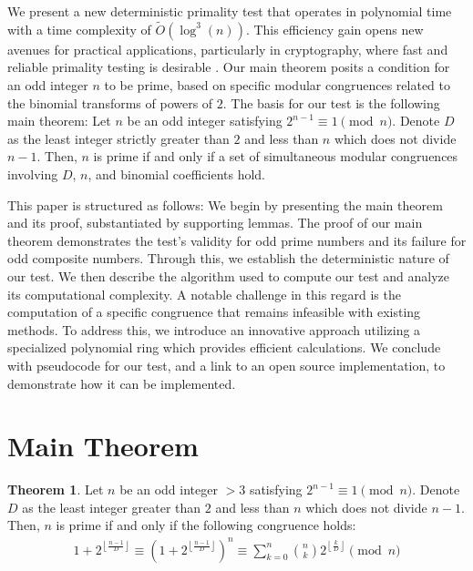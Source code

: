\documentclass{article}
\theoremstyle{plain}
\theoremstyle{definition}
\newtheorem{theorem}{Theorem}
\begin{document}
We present a new deterministic primality test that operates in polynomial time with a time complexity of $\tilde{O}(\log^3(n))$. This efficiency gain opens new avenues for practical applications, particularly in cryptography, where fast and reliable primality testing is desirable \cite{pomerance1984}. Our main theorem posits a condition for an odd integer \( n \) to be prime, based on specific modular congruences related to the binomial transforms of powers of $2$. The basis for our test is the following main theorem: Let \( n \) be an odd integer satisfying \( 2^{n-1} \equiv 1 \pmod{n} \). Denote \( D \) as the least integer strictly greater than \( 2 \) and less than \( n \) which does not divide \( n-1 \). Then, \( n \) is prime if and only if a set of simultaneous modular congruences involving \( D \), \( n \), and binomial coefficients hold.

This paper is structured as follows: We begin by presenting the main theorem and its proof, substantiated by supporting lemmas. The proof of our main theorem demonstrates the test's validity for odd prime numbers and its failure for odd composite numbers. Through this, we establish the deterministic nature of our test. We then describe the algorithm used to compute our test and analyze its computational complexity. A notable challenge in this regard is the computation of a specific congruence that remains infeasible with existing methods. To address this, we introduce an innovative approach utilizing a specialized polynomial ring which provides efficient calculations. We conclude with pseudocode for our test, and a link to an open source implementation, to demonstrate how it can be implemented.

\section{Main Theorem}

\begin{theorem}
\label{theorem:1}
Let $n$ be an odd integer $> 3$ satisfying $2^{n-1} \equiv 1 \pmod{n}$. Denote $D$ as the least integer greater than $2$ and less than $n$ which does not divide $n-1$. Then, $n$ is prime if and only if the following congruence holds:
\begin{align}
    1 + 2^{\left\lfloor \frac{n-1}{D} \right\rfloor} \equiv \left(1 + 2^{\left\lfloor \frac{n-1}{D} \right\rfloor}\right)^{n} \equiv \sum_{k=0}^{n} \binom{n}{k} 2^{\left\lfloor \frac{k}{D} \right\rfloor} \pmod{n}
\end{align}
\end{theorem}
\end{document}
